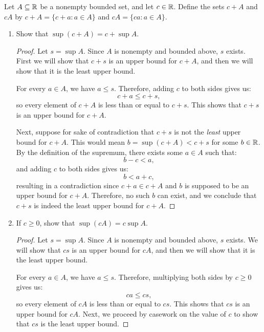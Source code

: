 \begin{problem}\label{prob:sup-inf-linear-transformation}
  Let $A \subseteq \mathbb{R}$ be a nonempty bounded set, and let $c \in \mathbb{R}$. Define the sets $c + A$ and $cA$ by 
  $c + A = \{c + a : a \in A\}$ and $cA = \{ca : a \in A\}$.
  \begin{enumerate}[label=(\alph*)]
    \item Show that $\sup(c + A) = c + \sup A$. \label{prob:sup-c+A}

      \begin{proof}
        Let $s = \sup A$. Since $A$ is nonempty and bounded above, $s$ exists. First we will show that $c + s$ is an upper bound for $c + A$, 
        and then we will show that it is the least upper bound.

        For every $a \in A$, we have $a \leq s$. Therefore, adding $c$ to both sides gives us:
        \[
          c + a \leq c + s,
        \]
        so every element of $c + A$ is less than or equal to $c + s$. This shows that $c + s$ is an upper bound for $c + A$.

        Next, suppose for sake of contradiction that $c + s$ is not the \textit{least} upper bound for $c + A$.
        This would mean $b = \sup(c + A) < c + s$ for some $b \in \mathbb{R}$. By the definition of the supremum, there exists some $a \in A$ such that:
        \[
          b - c < a,
        \] 
        and adding $c$ to both sides gives us:
        \[
          b < a + c,
        \]
        resulting in a contradiction since $c + a \in c + A$ and $b$ is supposed to be an upper bound for $c + A$.
        Therefore, no such $b$ can exist, and we conclude that $c + s$ is indeed the least upper bound for $c + A$.
      \end{proof}

    \item If $c \geq 0$, show that $\sup(cA) = c \sup A$. \label{prob:sup-cA}

      \begin{proof}
        Let $s = \sup A$. Since $A$ is nonempty and bounded above, $s$ exists. We will show that $c s$ is an upper bound for $cA$, and then 
        we will show that it is the least upper bound.

        For every $a \in A$, we have $a \leq s$. Therefore, multiplying both sides by $c \geq 0$ gives us:
        \[
          ca \leq cs,
        \]
        so every element of $cA$ is less than or equal to $cs$. This shows that $cs$ is an upper bound for $cA$. 
        Next, we proceed by casework on the value of $c$ to show that $cs$ is the least upper bound.


\end{proof}
\end{enumerate}
\end{problem}
